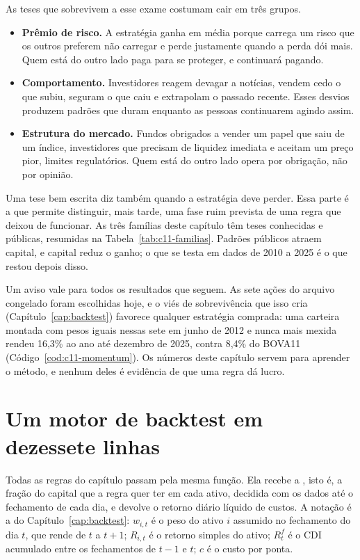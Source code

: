 As teses que sobrevivem a esse exame costumam cair em três grupos.

\begin{itemize}
  \item \textbf{Prêmio de risco.} A estratégia ganha em média porque carrega um risco que os outros preferem não carregar e perde justamente quando a perda dói mais. Quem está do outro lado paga para se proteger, e continuará pagando.
  \item \textbf{Comportamento.} Investidores reagem devagar a notícias, vendem cedo o que subiu, seguram o que caiu e extrapolam o passado recente. Esses desvios produzem padrões que duram enquanto as pessoas continuarem agindo assim.
  \item \textbf{Estrutura do mercado.} Fundos obrigados a vender um papel que saiu de um índice, investidores que precisam de liquidez imediata e aceitam um preço pior, limites regulatórios. Quem está do outro lado opera por obrigação, não por opinião.
\end{itemize}

Uma tese bem escrita diz também quando a estratégia deve perder. Essa parte é a que permite distinguir, mais tarde, uma fase ruim prevista de uma regra que deixou de funcionar. As três famílias deste capítulo têm teses conhecidas e públicas, resumidas na Tabela~\ref{tab:c11-familias}. Padrões públicos atraem capital, e capital reduz o ganho; o que se testa em dados de 2010 a 2025 é o que restou depois disso.

Um aviso vale para todos os resultados que seguem. As sete ações do arquivo congelado foram escolhidas hoje, e o viés de sobrevivência que isso cria (Capítulo~\ref{cap:backtest}) favorece qualquer estratégia comprada: uma carteira montada com pesos iguais nessas sete em junho de 2012 e nunca mais mexida rendeu 16,3\% ao ano até dezembro de 2025, contra 8,4\% do BOVA11 (Código~\ref{cod:c11-momentum}). Os números deste capítulo servem para aprender o método, e nenhum deles é evidência de que uma regra dá lucro.

\section{Um motor de backtest em dezessete linhas}
\label{sec:c11-motor}

Todas as regras do capítulo passam pela mesma função. Ela recebe a , isto é, a fração do capital que a regra quer ter em cada ativo, decidida com os dados até o fechamento de cada dia, e devolve o retorno diário líquido de custos. A notação é a do Capítulo~\ref{cap:backtest}: $w_{i,t}$ é o peso do ativo $i$ assumido no fechamento do dia $t$, que rende de $t$ a $t+1$; $R_{i,t}$ é o retorno simples do ativo; $R^f_t$ é o CDI acumulado entre os fechamentos de $t-1$ e $t$; $c$ é o custo por ponta.

